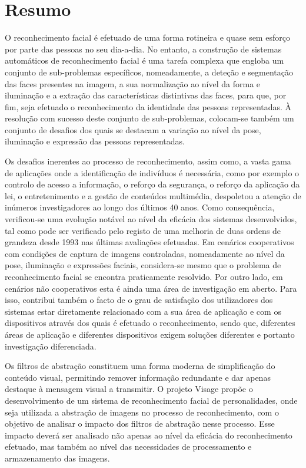 \chapter*{Resumo}
O reconhecimento facial é efetuado de uma forma rotineira e quase sem esforço por parte das pessoas no seu dia-a-dia. No entanto, a construção de sistemas automáticos de reconhecimento facial é uma tarefa complexa que engloba um conjunto de sub-problemas específicos, nomeadamente, a deteção e segmentação das faces presentes na imagem, a sua normalização ao nível da forma e iluminação e a extração das características distintivas das faces, para que, por fim, seja efetuado o reconhecimento da identidade das pessoas representadas. À resolução com sucesso deste conjunto de sub-problemas, colocam-se também um conjunto de desafios dos quais se destacam a variação ao nível da pose, iluminação e expressão das pessoas representadas.

Os desafios inerentes ao processo de reconhecimento, assim como, a vasta gama de aplicações onde a identificação de indivíduos é necessária, como por exemplo o controlo de acesso a informação, o reforço da segurança, o reforço da aplicação da lei, o entretenimento e a gestão de conteúdos multimédia, despoletou a atenção de inúmeros investigadores ao longo dos últimos 40 anos. Como consequência, verificou-se uma evolução notável ao nível da eficácia dos sistemas desenvolvidos, tal como pode ser verificado pelo registo de uma melhoria de duas ordens de grandeza desde 1993 nas últimas avaliações efetuadas. Em cenários cooperativos com condições de captura de imagens controladas, nomeadamente ao nível da pose, iluminação e expressões faciais, considera-se mesmo que o problema de reconhecimento facial se encontra praticamente resolvido. Por outro lado, em cenários não cooperativos esta é ainda uma área de investigação em aberto. Para isso, contribui também o facto de o grau de satisfação dos utilizadores dos sistemas estar diretamente relacionado com a sua área de aplicação e com os dispositivos através dos quais é efetuado o reconhecimento, sendo que, diferentes áreas de aplicação e diferentes dispositivos exigem soluções diferentes e portanto investigação diferenciada.

Os filtros de abstração constituem uma forma moderna de simplificação do conteúdo visual, permitindo remover informação redundante e dar apenas destaque à mensagem visual a transmitir. O projeto Visage propõe o desenvolvimento de um sistema de reconhecimento facial de personalidades, onde seja utilizada a abstração de imagens no processo de reconhecimento, com o objetivo de analisar o impacto dos filtros de abstração nesse processo. Esse impacto deverá ser analisado não apenas ao nível da eficácia do reconhecimento efetuado, mas também ao nível das necessidades de processamento e armazenamento das imagens.

